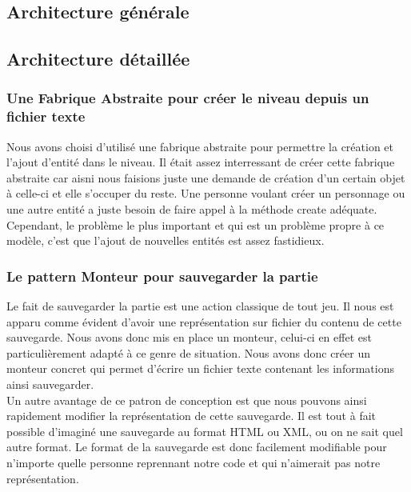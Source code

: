 \documentclass[a4paper,11pt]{article}
\begin{document}
\subsection{Architecture g\'en\'erale}

\begin{center}
\end{center}

\subsection{Architecture d\'etaill\'ee}

\subsubsection*{Une Fabrique Abstraite pour cr\'eer le niveau depuis un fichier
texte}
Nous avons choisi d'utilis\'e une fabrique abstraite pour permettre la
cr\'eation et l'ajout d'entit\'e dans le niveau. Il \'etait assez interressant
de cr\'eer cette fabrique abstraite car aisni nous faisions juste une
demande de cr\'eation d'un certain objet \`a celle-ci et elle s'occuper du
reste. Une personne voulant cr\'eer un personnage ou une autre entit\'e a
juste besoin de faire appel \`a la m\'ethode create ad\'equate. Cependant, le
probl\`eme le plus important et qui est un probl\`eme propre \`a ce mod\`ele,
c'est que l'ajout de nouvelles entit\'es est assez fastidieux.

\begin{center}
\end{center}

\subsubsection*{Le pattern Monteur pour sauvegarder la partie}
Le fait de sauvegarder la partie est une action classique de tout
jeu. Il nous est apparu comme \'evident d'avoir une repr\'esentation sur
fichier du contenu de cette sauvegarde. Nous avons donc mis en place un
monteur, celui-ci en effet est particuli\`erement adapt\'e \`a ce genre de
situation. Nous avons donc cr\'eer un monteur concret qui permet d'\'ecrire
un fichier texte contenant les informations ainsi sauvegarder.\\
Un autre avantage de ce patron de conception est que nous pouvons ainsi
rapidement modifier la repr\'esentation de cette sauvegarde. Il est tout \`a
fait possible d'imagin\'e une sauvegarde au format HTML ou XML, ou on ne
sait quel autre format. Le format de la sauvegarde est donc facilement
modifiable pour n'importe quelle personne reprennant notre code et qui
n'aimerait pas notre repr\'esentation. \\
\end{document}
